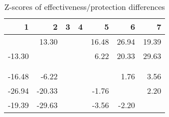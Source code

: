 \begin{table}[ht]
\centering
\begin{tabular}{rrrrrrr}
  \hline
1 & 2 & 3 & 4 & 5 & 6 & 7 \\ 
  \hline
 & 13.30 &  &  & 16.48 & 26.94 & 19.39 \\ 
  -13.30 &  &  &  & 6.22 & 20.33 & 29.63 \\ 
   &  &  &  &  &  &  \\ 
   &  &  &  &  &  &  \\ 
  -16.48 & -6.22 &  &  &  & 1.76 & 3.56 \\ 
  -26.94 & -20.33 &  &  & -1.76 &  & 2.20 \\ 
  -19.39 & -29.63 &  &  & -3.56 & -2.20 &  \\ 
   \hline
\end{tabular}
\caption{Z-scores of effectiveness/protection differences} 
\end{table}
